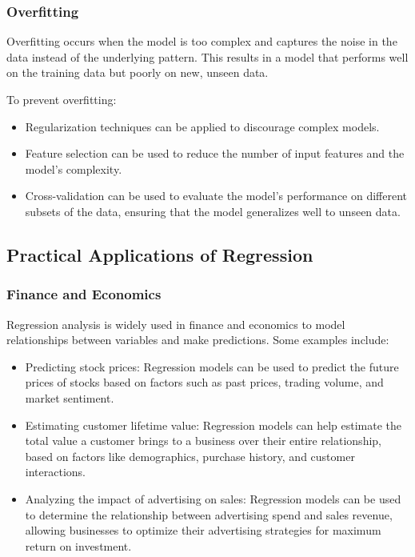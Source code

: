 \documentclass{article}
\begin{document}
\subsubsection{Overfitting}
Overfitting occurs when the model is too complex and captures the noise in the data instead of the underlying pattern. This results in a model that performs well on the training data but poorly on new, unseen data.

To prevent overfitting:

\begin{itemize}
\item Regularization techniques can be applied to discourage complex models.
\item Feature selection can be used to reduce the number of input features and the model's complexity.
\item Cross-validation can be used to evaluate the model's performance on different subsets of the data, ensuring that the model generalizes well to unseen data.
\end{itemize}

\subsection{Practical Applications of Regression}

\subsubsection{Finance and Economics}

Regression analysis is widely used in finance and economics to model relationships between variables and make predictions. Some examples include:

\begin{itemize}
\item Predicting stock prices: Regression models can be used to predict the future prices of stocks based on factors such as past prices, trading volume, and market sentiment.
\item Estimating customer lifetime value: Regression models can help estimate the total value a customer brings to a business over their entire relationship, based on factors like demographics, purchase history, and customer interactions.
\item Analyzing the impact of advertising on sales: Regression models can be used to determine the relationship between advertising spend and sales revenue, allowing businesses to optimize their advertising strategies for maximum return on investment.
\end{itemize}
\end{document}
